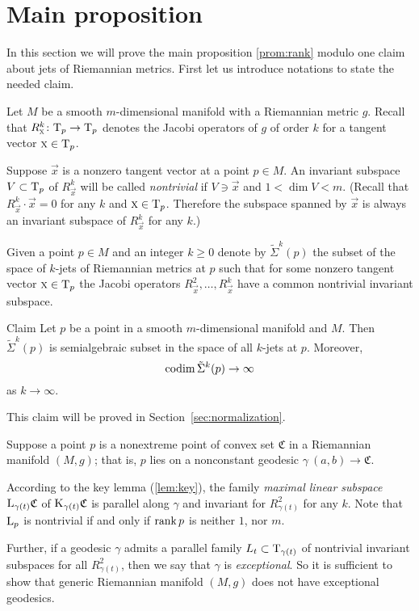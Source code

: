\documentclass[a4paper,10pt]{article}
\begin{document}
\section{Main proposition}

In this section we will prove the main proposition \ref{prom:rank} modulo one claim about jets of Riemannian metrics.
First let us introduce notations to state the needed claim.

Let $M$ be a smooth $m$-dimensional manifold with a Riemannian metric $g$.
Recall that $R^k_{\text{\sc{x}}}\colon\mathrm{T}_p\to\mathrm{T}_p$ denotes the Jacobi operators of $g$ of order $k$ for a tangent vector $\text{\sc{x}}\in\mathrm{T}_p$.

Suppose $\vec x$ is a nonzero tangent vector at a point $p\in M$.
An invariant subspace $V\subset \mathrm{T}_p$ of $R^k_{\vec{x}}$ will be called \emph{nontrivial} if $V\ni \vec{x}$ and $1< \dim V<m$.
(Recall that $R^k_{\vec{x}}\cdot \vec{x}=0$
for any $k$ and $\text{\sc{x}}\in \mathrm{T}_p$.
Therefore the subspace spanned by $\vec{x}$ is always an invariant subspace of $R^k_{\vec{x}}$ for any $k$.)


Given a point $p\in M$ and an integer $k\ge0$ denote by $\tilde\Sigma^k(p)$ the subset of the space of $k$-jets of Riemannian metrics at $p$ such that for some nonzero tangent vector $\text{\sc{x}}\in\mathrm{T}_p$ the Jacobi operators $R^2_{\vec{x}},\dots,R^k_{\vec{x}}$ have a common nontrivial invariant subspace.


\begin{thm}{Claim}\label{clm:codim(sigma)} 
Let $p$ be a point in a smooth $m$-dimensional manifold and $M$.
Then $\tilde\Sigma^k(p)$ is semialgebraic subset in the space of all $k$-jets at $p$.
Moreover, 
\[\operatorname{\rm codim}\tilde\Sigma^k(p)\to\infty\] 
as $k\to\infty$.
\end{thm}

This claim will be proved in Section~\ref{sec:normalization}.

Suppose a point $p$ is a nonextreme point of convex set $\mathfrak{C}$ in a Riemannian manifold $(M,g)$;
that is, $p$ lies on a nonconstant geodesic $\gamma\:(a,b)\to\mathfrak{C}$.

According to the key lemma (\ref{lem:key}), the family \emph{maximal linear subspace} $\mathrm{L}_{\gamma(t)}\mathfrak{C}$ of $\mathrm{K}_{\gamma(t)}\mathfrak{C}$ is parallel along $\gamma$ and invariant for $R^2_{\gamma(t)}$ for any $k$.
Note that $\mathrm{L}_p$ is nontrivial if and only if $\operatorname{\rm rank}\nolimits p$ is neither $1$, nor $m$.

Further, if a geodesic $\gamma$ admits a parallel family $L_t\subset \mathrm{T}_{\gamma(t)}$ of nontrivial invariant subspaces for all $R^2_{\gamma(t)}$, then we say that $\gamma$ is \emph{exceptional}.
So it is sufficient to show that generic Riemannian manifold $(M,g)$ does not have exceptional geodesics.
\end{document}
